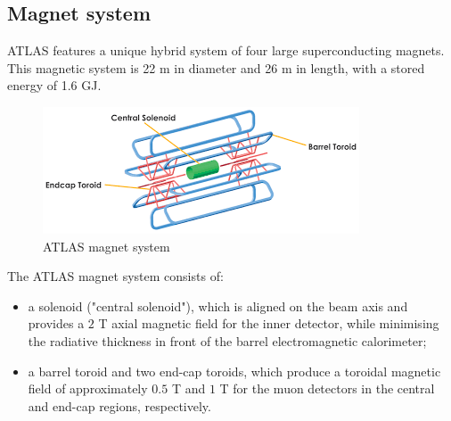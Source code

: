\documentclass[a4paper, oneside]{book}
\begin{document}
				\subsection{Magnet system}
					ATLAS features a unique hybrid system of four large superconducting magnets.  This magnetic system is 22 m in diameter and 26 m in length, with a stored energy of 1.6 GJ. \\
					\begin{figure}[H]
						\centering
						\includegraphics[width=0.5\textheight]{tesi_images/magnet_system_atlas.png}
						\caption{ATLAS magnet system}
					\end{figure}
					The  ATLAS  magnet  system consists of:
					\begin{itemize}
						\item a solenoid ("central solenoid"), which is aligned on the beam axis and provides a $2$ T axial magnetic field for the inner detector,  while minimising the radiative thickness in front of the barrel electromagnetic calorimeter;
						\item a  barrel  toroid and  two  end-cap  toroids, which  produce  a toroidal magnetic field of approximately $0.5$ T and $1$ T for the muon detectors in the central and end-cap regions, respectively.
					\end{itemize}
\end{document}

